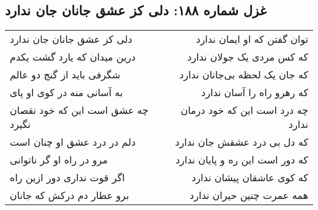 \begin{center}
\section*{غزل شماره ۱۸۸: دلی کز عشق جانان جان ندارد}
\label{sec:188}
\begin{longtable}{l p{0.5cm} r}
دلی کز عشق جانان جان ندارد
&&
توان گفتن که او ایمان ندارد
\\
درین میدان که یارد گشت یکدم
&&
که کس مردی یک جولان ندارد
\\
شگرفی باید از گنج دو عالم
&&
که جان یک لحظه بی‌جانان ندارد
\\
به آسانی منه در کوی او پای
&&
که رهرو راه را آسان ندارد
\\
چه عشق است این که خود نقصان نگیرد
&&
چه درد است این که خود درمان ندارد
\\
دلم در درد عشق او چنان است
&&
که دل بی درد عشقش جان ندارد
\\
مرو در راه او گر ناتوانی
&&
که دور است این ره و پایان ندارد
\\
اگر قوت نداری دور ازین راه
&&
که کوی عاشقان پیشان ندارد
\\
برو عطار دم درکش که جانان
&&
همه عمرت چنین حیران ندارد
\\
\end{longtable}
\end{center}
